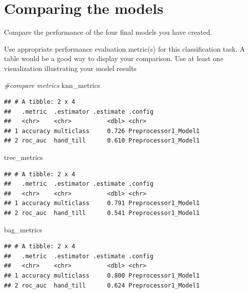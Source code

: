\documentclass[
]{article}
\newenvironment{Shaded}{\begin{snugshade}}{\end{snugshade}}
\newcommand{\CommentTok}[1]{\textcolor[rgb]{0.56,0.35,0.01}{\textit{#1}}}
\newcommand{\NormalTok}[1]{#1}
\begin{document}
\hypertarget{comparing-the-models}{%
\section{Comparing the models}\label{comparing-the-models}}

Compare the performance of the four final models you have created.

Use appropriate performance evaluation metric(s) for this classification
task. A table would be a good way to display your comparison. Use at
least one visualization illustrating your model results

\begin{Shaded}
\begin{Highlighting}[]
\CommentTok{\#compare metrics}
\NormalTok{knn\_metrics}
\end{Highlighting}
\end{Shaded}

\begin{verbatim}
## # A tibble: 2 x 4
##   .metric  .estimator .estimate .config             
##   <chr>    <chr>          <dbl> <chr>               
## 1 accuracy multiclass     0.726 Preprocessor1_Model1
## 2 roc_auc  hand_till      0.610 Preprocessor1_Model1
\end{verbatim}

\begin{Shaded}
\begin{Highlighting}[]
\NormalTok{tree\_metrics}
\end{Highlighting}
\end{Shaded}

\begin{verbatim}
## # A tibble: 2 x 4
##   .metric  .estimator .estimate .config             
##   <chr>    <chr>          <dbl> <chr>               
## 1 accuracy multiclass     0.791 Preprocessor1_Model1
## 2 roc_auc  hand_till      0.541 Preprocessor1_Model1
\end{verbatim}

\begin{Shaded}
\begin{Highlighting}[]
\NormalTok{bag\_metrics}
\end{Highlighting}
\end{Shaded}

\begin{verbatim}
## # A tibble: 2 x 4
##   .metric  .estimator .estimate .config             
##   <chr>    <chr>          <dbl> <chr>               
## 1 accuracy multiclass     0.800 Preprocessor1_Model1
## 2 roc_auc  hand_till      0.624 Preprocessor1_Model1
\end{verbatim}
\end{document}
